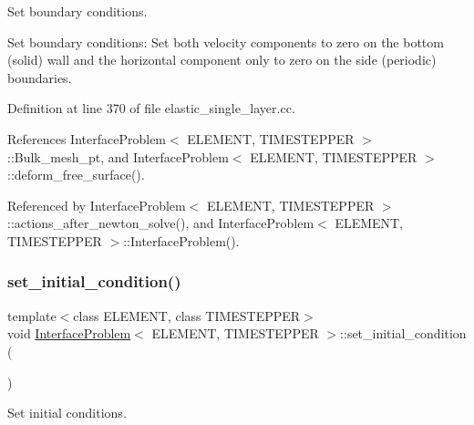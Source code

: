 Set boundary conditions. 

Set boundary conditions\+: Set both velocity components to zero on the bottom (solid) wall and the horizontal component only to zero on the side (periodic) boundaries. 

Definition at line 370 of file elastic\+\_\+single\+\_\+layer.\+cc.



References Interface\+Problem$<$ E\+L\+E\+M\+E\+N\+T, T\+I\+M\+E\+S\+T\+E\+P\+P\+E\+R $>$\+::\+Bulk\+\_\+mesh\+\_\+pt, and Interface\+Problem$<$ E\+L\+E\+M\+E\+N\+T, T\+I\+M\+E\+S\+T\+E\+P\+P\+E\+R $>$\+::deform\+\_\+free\+\_\+surface().



Referenced by Interface\+Problem$<$ E\+L\+E\+M\+E\+N\+T, T\+I\+M\+E\+S\+T\+E\+P\+P\+E\+R $>$\+::actions\+\_\+after\+\_\+newton\+\_\+solve(), and Interface\+Problem$<$ E\+L\+E\+M\+E\+N\+T, T\+I\+M\+E\+S\+T\+E\+P\+P\+E\+R $>$\+::\+Interface\+Problem().

\mbox{\label{classInterfaceProblem_a0d3af8378c4f0a6e38636be958c300d5}} 
\subsubsection{\texorpdfstring{set\+\_\+initial\+\_\+condition()}{set\_initial\_condition()}\hspace{0.1cm}{\footnotesize\ttfamily [1/2]}}
{\footnotesize\ttfamily template$<$class E\+L\+E\+M\+E\+NT, class T\+I\+M\+E\+S\+T\+E\+P\+P\+ER$>$ \\
void \hyperlink{classInterfaceProblem}{Interface\+Problem}$<$ E\+L\+E\+M\+E\+NT, T\+I\+M\+E\+S\+T\+E\+P\+P\+ER $>$\+::set\+\_\+initial\+\_\+condition (\begin{DoxyParamCaption}{ }\end{DoxyParamCaption})}



Set initial conditions. 

\mbox{\label{classInterfaceProblem_a0d3af8378c4f0a6e38636be958c300d5}} 
